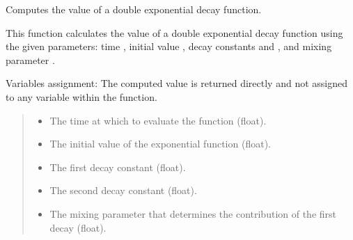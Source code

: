 \documentclass[letterpaper,10pt,english]{sphinxmanual}
\begin{document}
\begin{fulllineitems}
\begin{fulllineitems}
\end{fulllineitems}


\begin{fulllineitems}
\label{\detokenize{FLIMGraphics:FLIMGraphics.FLIMGraphic.double_Exponential}}
\pysigstartsignatures
{}
\pysigstopsignatures
\sphinxAtStartPar
Computes the value of a double exponential decay function.

\sphinxAtStartPar
This function calculates the value of a double exponential decay function using the given parameters: 
time , initial value , decay constants  and , and mixing parameter .

\sphinxAtStartPar
Variables assignment:
\sphinxhyphen{} The computed value is returned directly and not assigned to any variable within the function.
\begin{quote}\begin{description}
\begin{itemize}
\item {} 
\sphinxAtStartPar
{} \textendash{} The time at which to evaluate the function (float).

\item {} 
\sphinxAtStartPar
{} \textendash{} The initial value of the exponential function (float).

\item {} 
\sphinxAtStartPar
{} \textendash{} The first decay constant (float).

\item {} 
\sphinxAtStartPar
{} \textendash{} The second decay constant (float).

\item {} 
\sphinxAtStartPar
{} \textendash{} The mixing parameter that determines the contribution of the first decay (float).


\end{itemize}
\end{description}
\end{quote}
\end{fulllineitems}
\end{fulllineitems}
\end{document}
